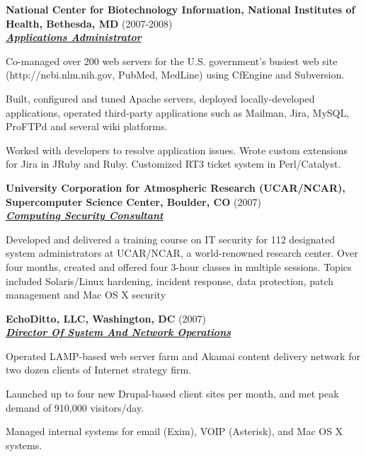 \documentclass{article}
\newcommand{\employer}[3]{{ \textbf{#1} (#2)\\ \underline{\textbf{\emph{#3}}}\\ \nopagebreak }}
\newenvironment{achievements}{\begin{list}{\topsep 0pt \itemsep -2pt}} {\vspace*{4pt}\end{list}}
\begin{document}
\employer{National Center for Biotechnology Information, National Institutes of Health, Bethesda, MD}{2007-2008}{Applications Administrator}
\begin{achievements}
   \item Co-managed over 200 web servers for the U.S. government's busiest web site (http://ncbi.nlm.nih.gov, PubMed, MedLine) using CfEngine and Subversion.
   \item Built, configured and tuned Apache servers, deployed locally-developed applications, operated third-party applications such as Mailman, Jira, MySQL, ProFTPd and several wiki platforms.
   \item Worked with developers to resolve application issues.  Wrote custom extensions for Jira in JRuby and Ruby.  Customized RT3 ticket system in Perl/Catalyst.
\end{achievements}

\employer{University Corporation for Atmospheric Research (UCAR/NCAR), Supercomputer Science Center, Boulder, CO}{2007}{Computing Security Consultant}
\begin{achievements}
\item Developed and delivered a training course on IT security for 112 designated system administrators at UCAR/NCAR, a world-renowned research center.  Over four months, created and offered four 3-hour classes in multiple sessions. Topics included Solaris/Linux hardening, incident response, data protection, patch management and Mac OS X security
\end{achievements}

\employer{EchoDitto, LLC, Washington, DC}{2007}{Director Of System And Network Operations}
\begin{achievements}
  \item Operated LAMP-based web server farm and Akamai content delivery network for two dozen clients of Internet strategy firm.
  \item Launched up to four new Drupal-based client sites per month, and met peak demand of 910,000 visitors/day.
  \item Managed internal systems for email (Exim), VOIP (Asterisk), and Mac OS X systems.
\end{achievements}
\end{document}

